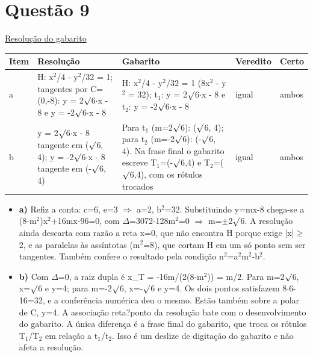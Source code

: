 \documentclass{article}%
\begin{document}
\section*{Questão 9}%
\href{https://poliedroresolve.sistemapoliedro.com.br/vestibulares/ita/2026/ita-2-fase-dia-1-28-10-2025-2-fase-dia-1/dissertativa-9-matematica-2-fase-dia-1-ita-2026}{Resolução do gabarito}\par\smallskip%
\begin{longtable}{@{}p{} p{} p{} p{} p{}@{}}\toprule Item & Resolução & Gabarito & Veredito & Certo \\ \midrule
a & H: x$^2$/4 - y$^2$/32 = 1; tangentes por C=(0,-8): y = 2$\surd$6$\cdot$x - 8 e y = -2$\surd$6$\cdot$x - 8 & H: x$^2$/4 - y$^2$/32 = 1 (8x$^2$ - y$^2$ = 32); t$_{1}$: y = 2$\surd$6$\cdot$x - 8 e t$_{2}$: y = -2$\surd$6$\cdot$x - 8 & igual & ambos \\
b & y = 2$\surd$6$\cdot$x - 8 tangente em ($\surd$6, 4); y = -2$\surd$6$\cdot$x - 8 tangente em (-$\surd$6, 4) & Para t$_{1}$ (m=2$\surd$6): ($\surd$6, 4); para t$_{2}$ (m=-2$\surd$6): (-$\surd$6, 4). Na frase final o gabarito escreve T$_{1}$=(-$\surd$6,4) e T$_{2}$=($\surd$6,4), com os rótulos trocados & igual & ambos \\
\bottomrule\end{longtable}%
\begin{itemize}%
\item%
\textbf{a)} Refiz a conta: c=6, e=3 $\Rightarrow$ a=2, b$^2$=32. Substituindo y=mx-8 chega{-}se a (8-m$^2$)x$^2$+16mx-96=0, com $\Delta$=3072-128m$^2$=0 $\Rightarrow$ m=$\pm$2$\surd$6. A resolução ainda descarta com razão a reta x=0, que não encontra H porque exige |x|$\geq$2, e as paralelas às assíntotas (m$^2$=8), que cortam H em um só ponto sem ser tangentes. Também confere o resultado pela condição n$^2$=a$^2$m$^2$-b$^2$.%
\item%
\textbf{b)} Com $\Delta$=0, a raiz dupla é x\_T = -16m/(2(8-m$^2$)) = m/2. Para m=2$\surd$6, x=$\surd$6 e y=4; para m=-2$\surd$6, x=-$\surd$6 e y=4. Os dois pontos satisfazem 8$\cdot$6-16=32, e a conferência numérica deu o mesmo. Estão também sobre a polar de C, y=4. A associação reta?ponto da resolução bate com o desenvolvimento do gabarito. A única diferença é a frase final do gabarito, que troca os rótulos T$_{1}$/T$_{2}$ em relação a t$_{1}$/t$_{2}$. Isso é um deslize de digitação do gabarito e não afeta a resolução.%
\end{itemize}%
\end{document}
